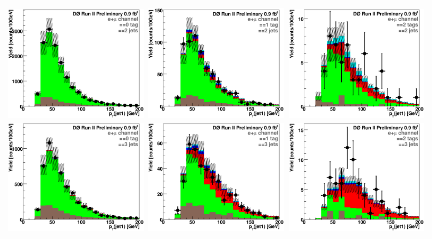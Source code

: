 \begin{figure}[!h!tbp]
\begin{center}
\includegraphics[width=0.32\textwidth]{eps/DataBackground/EMU/emu_EqZeroTag_EqTwoJet_Jet1Pt.eps}
\includegraphics[width=0.32\textwidth]{eps/DataBackground/EMU/emu_EqOneTag_EqTwoJet_Jet1Pt.eps}
\includegraphics[width=0.32\textwidth]{eps/DataBackground/EMU/emu_EqTwoTag_EqTwoJet_Jet1Pt.eps}
\includegraphics[width=0.32\textwidth]{eps/DataBackground/EMU/emu_EqZeroTag_EqThreeJet_Jet1Pt.eps}
\includegraphics[width=0.32\textwidth]{eps/DataBackground/EMU/emu_EqOneTag_EqThreeJet_Jet1Pt.eps}
\includegraphics[width=0.32\textwidth]{eps/DataBackground/EMU/emu_EqTwoTag_EqThreeJet_Jet1Pt.eps}

\end{center}
\end{figure}
